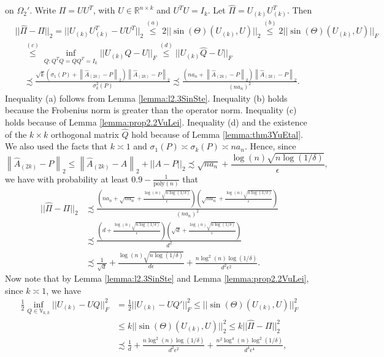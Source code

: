 \documentclass{article}
\begin{document}
on $\Omega_2'$. Write $\Pi = UU^T$, with $U \in \mathbb{R}^{n \times k}$ and $U^TU = I_k$. Let $\hat{\Pi} = U_{(k)}U_{(k)}^T$. Then 
\begin{align*}
& ||\hat{\Pi} - \Pi||_2 = ||U_{(k)}U_{(k)}^T - UU^T||_2 \stackrel{(a)}{\leq} 2||\sin(\Theta)(U_{(k)}, U)||_2 \stackrel{(b)}{\leq} 2||\sin(\Theta)(U_{(k)}, U)||_F\\
& \quad \stackrel{(c)}{\leq} \mathop{\inf}_{Q: Q^TQ = QQ^T = I_k}||U_{(k)}Q - U||_F \stackrel{(d)}{\leq} ||U_{(k)}\hat{Q} - U||_F\\
& \quad \precsim \frac{\sqrt{k}\left(\sigma_1(P) + \left\|\hat{A}_{(2k)} - P\right\|_2\right)\left\|\hat{A}_{(2k)} - P\right\|_2}{\sigma_k^2(P)} \precsim \frac{\left(na_n + \left\|\hat{A}_{(2k)} - P\right\|_2\right)\left\|\hat{A}_{(2k)} - P\right\|_2}{(na_n)^2}.
\end{align*}
Inequality (a) follows from Lemma \ref{lemma:l2.3SinSte}. Inequality (b) holds because the Frobenius norm is greater than the operator norm. Inequality (c) holds because of Lemma \ref{lemma:prop2.2VuLei}. Inequality (d) and the existence of the $k \times k$ orthogonal matrix $\hat{Q}$ hold because of Lemma \ref{lemma:thm3YuEtal}. We also used the facts that $k \asymp 1$ and $\sigma_1(P) \asymp \sigma_{k}(P) \asymp na_n$. Hence, since
\begin{equation*}
\left\|\hat{A}_{(2k)} - P\right\|_2 \leq \left\|\hat{A}_{(2k)} - A\right\|_2 +  ||A - P||_2 \precsim \sqrt{na_n} + \frac{\log(n)\sqrt{n\log(1/\delta)}}{\epsilon},
\end{equation*}
we have with probability at least $0.9 - \frac{1}{\mathrm{poly}(n)}$ that
\begin{align*}
||\hat{\Pi} - \Pi||_2 &\precsim \frac{\left(na_n + \sqrt{na_n} + \frac{\log(n)\sqrt{n\log(1/\delta)}}{\epsilon}\right)\left(\sqrt{na_n} + \frac{\log(n)\sqrt{n\log(1/\delta)}}{\epsilon}\right)}{(na_n)^2}\\
&\precsim \frac{\left(d + \frac{\log(n)\sqrt{n\log(1/\delta)}}{\epsilon}\right)\left(\sqrt{d} + \frac{\log(n)\sqrt{n\log(1/\delta)}}{\epsilon}\right)}{d^2}\\
&\precsim \frac{1}{\sqrt{d}} + \frac{\log(n)\sqrt{n\log(1/\delta)}}{d\epsilon} + \frac{n\log^2(n)\log(1/\delta)}{d^2\epsilon^2}.
\end{align*}
Now note that by Lemma \ref{lemma:l2.3SinSte} and Lemma \ref{lemma:prop2.2VuLei}, since $k \asymp 1$, we have
\begin{align*}
\frac{1}{2}\inf\limits_{Q \in \mathbb{V}_{k, k}}||U_{(k)} - UQ||_F^2 & = \frac{1}{2}||U_{(k)} - UQ'||_F^2 \leq ||\sin(\Theta)(U_{(k)}, U)||_F^2 \\
%
& \leq k||\sin(\Theta)(U_{(k)}, U)||_2^2 \leq k||\hat{\Pi} - \Pi||_2^2\\
&\precsim \frac{1}{d} + \frac{n\log^2(n)\log(1/\delta)}{d^2\epsilon^2} + \frac{n^2\log^4(n)\log^2(1/\delta)}{d^4\epsilon^4},   
\end{align*}
\end{document}
